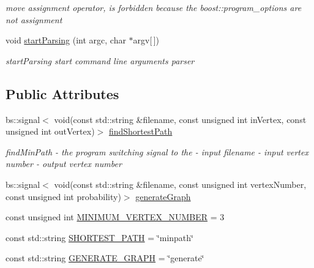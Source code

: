 \begin{DoxyCompactItemize}
\begin{DoxyCompactList}\small\item\em move assignment operator, is forbidden because the boost\+::program\+\_\+options are not assignment \end{DoxyCompactList}\item 
void \hyperlink{a00002_a9d84b7749b05e439efcd353dde3e0586_a9d84b7749b05e439efcd353dde3e0586}{start\+Parsing} (int argc, char $\ast$argv\mbox{[}$\,$\mbox{]})
\begin{DoxyCompactList}\small\item\em start\+Parsing start command line arguments parser \end{DoxyCompactList}\end{DoxyCompactItemize}
\subsection*{Public Attributes}
\begin{DoxyCompactItemize}
\item 
bs\+::signal$<$ void(const std\+::string \&filename, const unsigned int in\+Vertex, const unsigned int out\+Vertex)$>$ \hyperlink{a00002_a7eb42d6b80eabc27953b1e2ddb08f7f1_a7eb42d6b80eabc27953b1e2ddb08f7f1}{find\+Shortest\+Path}
\begin{DoxyCompactList}\small\item\em find\+Min\+Path -\/ the program switching signal to the   -\/ input filename  -\/ input vertex number  -\/ output vertex number \end{DoxyCompactList}\item 
bs\+::signal$<$ void(const std\+::string \&filename, const unsigned int vertex\+Number, const unsigned int probability)$>$ \hyperlink{a00002_a5a6e6dd3ac7502d0269b2756383f1923_a5a6e6dd3ac7502d0269b2756383f1923}{generate\+Graph}
\item 
const unsigned int \hyperlink{a00002_a25b69ee820b15148121a85e344f6d26a_a25b69ee820b15148121a85e344f6d26a}{M\+I\+N\+I\+M\+U\+M\+\_\+\+V\+E\+R\+T\+E\+X\+\_\+\+N\+U\+M\+B\+ER} = 3
\item 
const std\+::string \hyperlink{a00002_a552c30c543bb251f8c43b528ce8d3537_a552c30c543bb251f8c43b528ce8d3537}{S\+H\+O\+R\+T\+E\+S\+T\+\_\+\+P\+A\+TH} = \char`\"{}minpath\char`\"{}
\item 
const std\+::string \hyperlink{a00002_a4b56bd44886c90debd323f54761489a6_a4b56bd44886c90debd323f54761489a6}{G\+E\+N\+E\+R\+A\+T\+E\+\_\+\+G\+R\+A\+PH} = \char`\"{}generate\char`\"{}
\end{DoxyCompactItemize}
